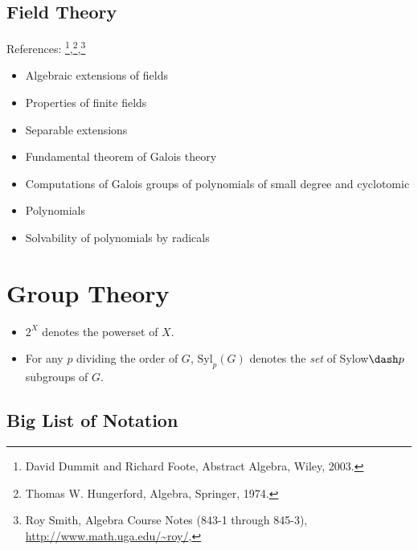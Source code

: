 \hypertarget{field-theory}{%
\subsection{Field Theory}\label{field-theory}}

References: \footnote{David Dummit and Richard Foote, Abstract Algebra,
  Wiley, 2003.},\footnote{Thomas W. Hungerford, Algebra, Springer, 1974.},\footnote{Roy
  Smith, Algebra Course Notes (843-1 through 845-3),
  \url{http://www.math.uga.edu/~roy/},}

\begin{itemize}
\item
  Algebraic extensions of fields
\item
  Properties of finite fields
\item
  Separable extensions
\item
  Fundamental theorem of Galois theory
\item
  Computations of Galois groups of polynomials of small degree and
  cyclotomic
\item
  Polynomials
\item
  Solvability of polynomials by radicals
\end{itemize}

\newpage

\hypertarget{group-theory-1}{%
\section{Group Theory}\label{group-theory-1}}

\begin{itemize}
\tightlist
\item
  \(2^X\) denotes the powerset of \(X\).
\item
  For any \(p\) dividing the order of \(G\), \(\mathrm{Syl}_p(G)\)
  denotes the \emph{set} of Sylow\(\dash p\) subgroups of \(G\).
\end{itemize}

\hypertarget{big-list-of-notation}{%
\subsection{Big List of Notation}\label{big-list-of-notation}}

